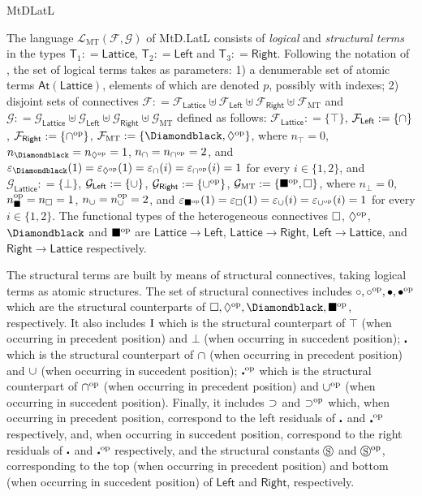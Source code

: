 \begin{entry}{MtDLatL}
\begin{clarifications}
The language $\mathcal{L}_\mathrm{MT}(\mathcal{F}, \mathcal{G})$ of  MtD.LatL consists of  {\em logical}   and {\em structural terms} in the types $\mathsf{T}_1:  = \mathsf{Lattice}$, $\mathsf{T}_2: = \mathsf{Left}$ and $\mathsf{T}_3: = \mathsf{Right}$. Following the notation of , the set of logical terms takes as parameters: 1) a denumerable set of atomic terms $\mathsf{At}(\mathsf{Lattice})$, elements of which are denoted $p$, possibly with indexes; 2) disjoint sets of connectives $\mathcal{F}: = \mathcal{F}_{\mathsf{Lattice}}\uplus\mathcal{F}_{\mathsf{Left}}\uplus\mathcal{F}_{\mathsf{Right}}\uplus\mathcal{F}_{\mathrm{MT}}$ and $\mathcal{G}: = \mathcal{G}_{\mathsf{Lattice}}\uplus\mathcal{G}_{\mathsf{Left}}\uplus\mathcal{G}_{\mathsf{Right}}\uplus\mathcal{G}_{\mathrm{MT}}$ defined as follows: $\mathcal{F}_{\mathsf{Lattice}}: = \{\top\}$, $\mathcal{F}_{\mathsf{Left}}: = \{\cap \}$, $\mathcal{F}_{\mathsf{Right}}: = \{\cap^\mathrm{op} \}$, $\mathcal{F}_{\mathrm{MT}}: = \{\pbdiabp, \diawp\}$, where $n_\top = 0$, $n_{\pbdiabp} =n_{\diawp} = 1$, $n_{\cap} = n_{\cap^\mathrm{op}} = 2$, and $\varepsilon_{\pbdiabp}(1) = \varepsilon_{\diawp}(1) = \varepsilon_{\pand}(i) = \varepsilon_{\andp}(i) = 1$ for every $i\in \{1, 2\}$, and
$\mathcal{G}_{\mathsf{Lattice}}: = \{\bot\}$, $\mathcal{G}_{\mathsf{Left}}: = \{\cup \}$, $\mathcal{G}_{\mathsf{Right}}: = \{\cup^\mathrm{op} \}$, $\mathcal{G}_{\mathrm{MT}}: = \{\blacksquare^\mathrm{op}, \Box\}$, where $n_\bot = 0$, $n_\blacksquare^\mathrm{op} =n_\Box = 1$, $n_\cup = n_\cup^\mathrm{op} = 2$, and $\varepsilon_{\blacksquare^\mathrm{op}}(1) = \varepsilon_{\Box}(1) = \varepsilon_{\cup}(i) = \varepsilon_{\cup^\mathrm{op}}(i) = 1$ for every $i\in \{1, 2\}$.
The functional types of the heterogeneous connectives $\Box$, $\Diamond^\mathrm{op}$, $\pbdiabp$ and $\blacksquare^\mathrm{op}$ are $\mathsf{Lattice}\rightarrow \mathsf{Left}$,  $\mathsf{Lattice}\rightarrow \mathsf{Right}$, $\mathsf{Left}\rightarrow \mathsf{Lattice}$, and  $\mathsf{Right}\rightarrow \mathsf{Lattice}$ respectively.

The structural terms are built by means of structural connectives, taking logical terms as atomic structures. The set of structural connectives includes  $\circ, \circ^\mathrm{op}, \bullet, \bullet^\mathrm{op}$   which are the structural counterparts of $\pwbox, \diawp, \pbdiabp, \boxbp$, respectively.  It also includes $\textrm{I}$ which is the structural counterpart of $\top$ (when occurring in precedent position) and $\bot$ (when occurring in succedent position); $\centerdot$ which is the structural counterpart of $\cap$ (when occurring in precedent position) and $\cup $ (when occurring in succedent position); $\centerdot^\mathrm{op}$ which is the structural counterpart of $\cap^\mathrm{op}$ (when occurring in precedent position) and $\cup^\mathrm{op} $ (when occurring in succedent position). Finally, it includes $\supset$ and $\supset^\mathrm{op}$ which, when occurring in precedent position, correspond to the left residuals of $\centerdot$ and $\centerdot^\mathrm{op}$ respectively,  and, when occurring in succedent position, correspond to the right residuals of $\centerdot$ and $\centerdot^\mathrm{op}$ respectively, and the structural constants  $\circledS$ and $\circledS^\mathrm{op}$, corresponding to the top (when occurring in precedent position) and bottom (when occurring in succedent position) of $\mathsf{Left}$ and $\mathsf{Right}$, respectively.


\end{clarifications}
\end{entry}
